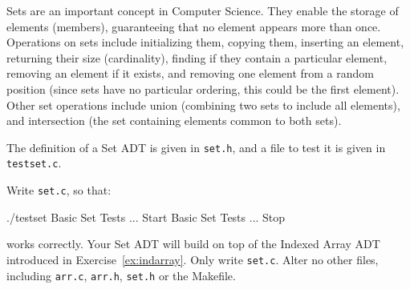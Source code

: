 
Sets are an important concept in Computer Science. They enable the
storage of elements (members), guaranteeing that no element appears more than
once. Operations on sets include initializing them, copying them,
inserting an element, returning their size (cardinality), finding if
they contain a particular element, removing an element if it exists, and
removing one element from a random position (since sets have no particular
ordering, this could be the first element). Other set operations include
union (combining two sets to include all elements), and intersection
(the set containing elements common to both sets).


The definition of a Set ADT is given in \verb^set.h^, and a file to test it is given
in \verb^testset.c^.

\begin{exercise}
Write \verb^set.c^, so that:
{\small
\begin{terminaloutput}
./testset
Basic Set Tests ... Start
Basic Set Tests ... Stop
\end{terminaloutput}
}
\noindent works correctly. Your Set ADT will build on top of the Indexed Array ADT introduced in
Exercise~\ref{ex:indarray}.
Only write \verb^set.c^. Alter no other files, including \verb^arr.c^, \verb^arr.h^,
\verb^set.h^ or the Makefile.
\end{exercise}
